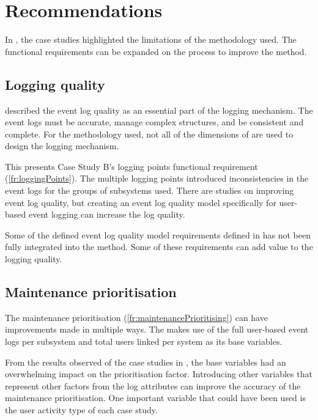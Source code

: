 \section{Recommendations}
In , the case studies highlighted the limitations of the methodology used. The functional requirements can be expanded on the process to improve the method.

\subsection{Logging quality}
 described the event log quality as an essential part of the logging mechanism. The event logs must be accurate, manage complex structures, and be consistent and complete. For the methodology used, not all of the dimensions of  are used to design the logging mechanism.\par This presents Case Study B's logging points functional requirement (\ref{fr:loggingPoints}). The multiple logging points introduced inconsistencies in the event logs for the groups of subsystems used. There are studies on improving event log quality, but creating an event log quality model specifically for user-based event logging can increase the log quality. \par Some of the defined event log quality model requirements defined in  has not been fully integrated into the method. Some of these requirements can add value to the logging quality.

\subsection{Maintenance prioritisation}
The maintenance prioritisation (\ref{fr:maintenancePrioritising}) can have improvements made in multiple ways. The  makes use of the full user-based event logs per subsystem and total users linked per system as its base variables.\par From the results observed of the case studies in , the base variables had an overwhelming impact on the prioritisation factor. Introducing other variables that represent other factors from the log attributes can improve the accuracy of the maintenance prioritisation. One important variable that could have been used is the user activity type of each case study.

